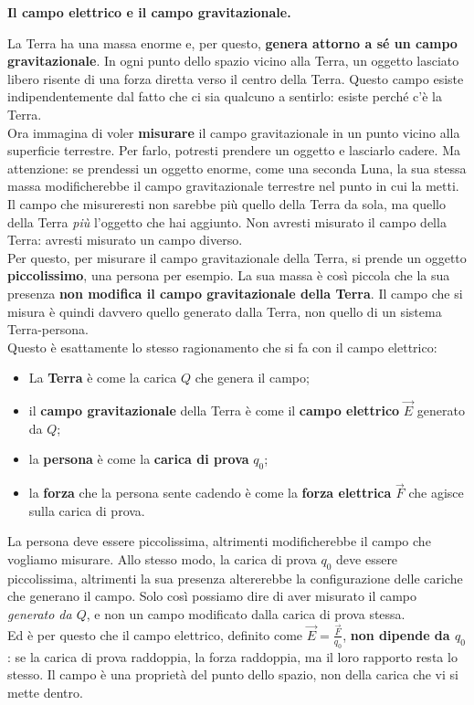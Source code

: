 \begin{esempio}
\textbf{Il campo elettrico e il campo gravitazionale.}

La Terra ha una massa enorme e, per questo, \textbf{genera attorno a sé un campo gravitazionale}. In ogni punto dello spazio vicino alla Terra, un oggetto lasciato libero risente di una forza diretta verso il centro della Terra. Questo campo esiste indipendentemente dal fatto che ci sia qualcuno a sentirlo: esiste perché c'è la Terra.\\

Ora immagina di voler \textbf{misurare} il campo gravitazionale in un punto vicino alla superficie terrestre. Per farlo, potresti prendere un oggetto e lasciarlo cadere. Ma attenzione: se prendessi un oggetto enorme, come una seconda Luna, la sua stessa massa modificherebbe il campo gravitazionale terrestre nel punto in cui la metti. Il campo che misureresti non sarebbe più quello della Terra da sola, ma quello della Terra \emph{più} l'oggetto che hai aggiunto. Non avresti misurato il campo della Terra: avresti misurato un campo diverso.\\

Per questo, per misurare il campo gravitazionale della Terra, si prende un oggetto \textbf{piccolissimo}, una persona per esempio. La sua massa è così piccola che la sua presenza \textbf{non modifica il campo gravitazionale della Terra}. Il campo che si misura è quindi davvero quello generato dalla Terra, non quello di un sistema Terra-persona.\\

Questo è esattamente lo stesso ragionamento che si fa con il campo elettrico:

\begin{itemize}[leftmargin=1cm]
  \item La \textbf{Terra} è come la carica \(Q\) che genera il campo;
  \item il \textbf{campo gravitazionale} della Terra è come il \textbf{campo elettrico} \(\vec{E}\) generato da \(Q\);
  \item la \textbf{persona} è come la \textbf{carica di prova} \(q_0\);
  \item la \textbf{forza} che la persona sente cadendo è come la \textbf{forza elettrica} \(\vec{F}\) che agisce sulla carica di prova.
\end{itemize}

La persona deve essere piccolissima, altrimenti modificherebbe il campo che vogliamo misurare. Allo stesso modo, la carica di prova \(q_0\) deve essere piccolissima, altrimenti la sua presenza altererebbe la configurazione delle cariche che generano il campo. Solo così possiamo dire di aver misurato il campo \emph{generato da \(Q\)}, e non un campo modificato dalla carica di prova stessa.\\

Ed è per questo che il campo elettrico, definito come \(\vec{E} = \frac{\vec{F}}{q_0}\), \textbf{non dipende da \(q_0\)}: se la carica di prova raddoppia, la forza raddoppia, ma il loro rapporto resta lo stesso. Il campo è una proprietà del punto dello spazio, non della carica che vi si mette dentro.
\end{esempio}




